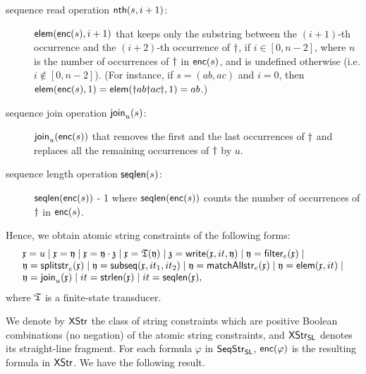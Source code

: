 \begin{description}
%
\item[sequence read operation ${\sf nth}(s, i+1)$:] ${\sf elem}({\sf enc}(s), i+1)$ that keeps only the substring between the $(i+1)$-th occurrence  and the $(i+2)$-th occurrence of $\dag$, if $i\in[0,n-2]$, where $n$ is the number of occurrences of $\dag$ in ${\sf enc}(s)$, and is undefined otherwise (i.e. $i\not\in[0,n-2]$). (For instance, if $s = (ab, ac)$ and $i = 0$, then ${\sf elem}({\sf enc}(s), 1) = {\sf elem}(\dag ab \dag ac \dag, 1) = ab$.)
%
\item[sequence join operation $\mathsf{join}_u(s)$:] $\mathsf{join}_u({\sf enc}(s))$ that removes the first and the last occurrences of $\dag$ and replaces all the remaining occurrences of $\dag$ by $u$.
\item[sequence length operation $\mathsf{seqlen}(s)$:] $\mathsf{seqlen}({\sf enc}(s))$ - 1 where $\mathsf{seqlen}({\sf enc}(s))$ counts the number of occurrences of $\dag$ in ${\sf enc}(s)$.
\end{description}

Hence, we obtain atomic string constraints %
of the following forms:
\[\begin{array} {l}
\mathfrak{x} = u \mid \mathfrak{x} = \mathfrak{y} \mid \mathfrak{x} = \mathfrak{y} \cdot \mathfrak{z} \mid \mathfrak{x} = \mathfrak{T}(\mathfrak{y}) \mid \mathfrak{z} = \mathsf{write}(\mathfrak{x}, it, \mathfrak{y}) \mid  \mathfrak{y}  = {\sf filter}_e(\mathfrak{x})  \mid   \\
\mathfrak{y} = \mathsf{splitstr}_e(\mathfrak{x}) \mid \mathfrak{y} = {\sf subseq}(\mathfrak{x}, it_1, it_2) \mid   
 \mathfrak{y} = \mathsf{matchAllstr}_e(\mathfrak{x}) \mid \mathfrak{y} = {\sf elem}(\mathfrak{x}, it)  \mid \\
 \mathfrak{y} = \mathsf{join}_u(\mathfrak{x}) \mid it = \mathsf{strlen}(\mathfrak{x}) \mid it = \mathsf{seqlen}(\mathfrak{x}),
\end{array}\]
where $\mathfrak{T}$ is a finite-state transducer. 

We denote by ${\sf XStr}$ %
the class of string constraints which are %
positive Boolean combinations (no negation) of the atomic string constraints, and  %
${\sf XStr}_{\sf SL}$ denotes its straight-line fragment.  %
For each formula $\varphi$ in ${\sf SeqStr}_{\sf SL}$, ${\sf enc}(\varphi)$ is the resulting formula in ${\sf XStr}$. We have the following result.

